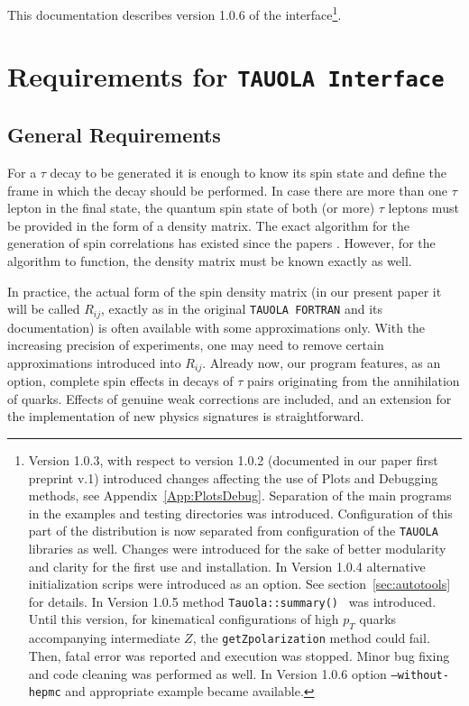 \documentclass[]{Tauola_interface_design}
\begin{document}
This documentation describes version 1.0.6 of the interface\footnote{Version 1.0.3,
with respect to version 1.0.2 (documented in our paper first preprint v.1)
introduced changes affecting the use of Plots and Debugging methods, see
Appendix~\ref{App:PlotsDebug}. Separation of the main programs in the 
examples and testing directories was introduced. Configuration of this part 
of the distribution is now separated from configuration of the {\tt TAUOLA} 
libraries as well. Changes were introduced for the sake of better modularity
and clarity for the first use and installation. In Version 1.0.4 alternative initialization scrips were introduced 
as an option. See section~\ref{sec:autotools} for details. 
In Version 1.0.5 method {\tt Tauola::summary() } was introduced.
Until this  version, for kinematical configurations
of  high $p_T$ quarks accompanying 
intermediate $Z$, the {\tt getZpolarization} method  could fail. Then,   fatal error was reported 
and  execution was stopped.  Minor  
bug fixing and code cleaning was performed as well.
In Version 1.0.6 option {\tt --without-hepmc} and appropriate example 
became available.}.

\section{Requirements  for {\tt TAUOLA Interface} }

\subsection{General Requirements}
\label{sect:General}

For a $\tau$ decay to be generated it is enough to know its spin 
state and define the frame in which the decay should be performed. In case there are
more than one $\tau$ lepton in the final state, the quantum spin state of
both (or more) $\tau$ leptons must be provided in the form of a density matrix.
The exact  algorithm for the generation of spin correlations has existed 
since the papers \cite{Jadach:1990mz,Jezabek:1991qp,Jadach:1993hs}. 
However, for the algorithm to function, the density matrix must be known exactly as well.


In practice, the actual form of the spin density matrix 
(in our present paper it will be called $R_{ij}$, exactly as in the original 
{\tt TAUOLA FORTRAN} and its documentation) is often available  with some
approximations only.
With the increasing precision  of experiments,  
one may need to remove certain approximations introduced into $R_{ij}$.
Already now, our program  features, as an option,
complete spin effects in decays of $\tau$ pairs originating from the annihilation 
of quarks. Effects of genuine weak corrections are included, and an extension 
for the implementation of new physics signatures is straightforward. 
 
\end{document}
